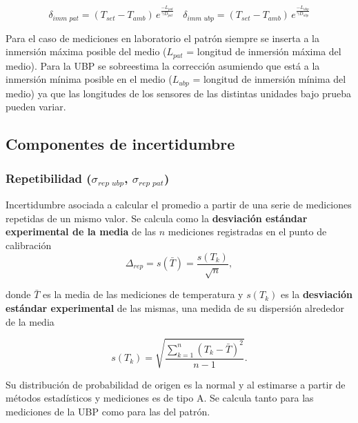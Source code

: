 \begin{equation}
    \delta_{\textit{imm pat}} = (T_{set} - T_{amb})\,e^{\frac{-L_{pat}}{\gamma D_{pat}}} \ \ \ \ \delta_{\textit{imm ubp}} = (T_{set} - T_{amb})\,e^{\frac{-L_{ubp}}{\gamma D_{ubp}}}
\end{equation}

Para el caso de mediciones en laboratorio el patrón siempre se inserta a la inmersión máxima posible del medio ($L_{pat}$ = longitud de inmersión máxima del medio). Para la UBP se sobreestima la corrección asumiendo que está a la inmersión mínima posible en el medio ($L_{ubp}$ = longitud de inmersión mínima del medio) ya que las longitudes de los sensores de las distintas unidades bajo prueba pueden variar.

\subsection{Componentes de incertidumbre}\label{sec:componentes}

\subsubsection{Repetibilidad ($\sigma_{\textit{rep ubp}}$, $\sigma_{\textit{rep pat}}$)}

Incertidumbre asociada a calcular el promedio a partir de una serie de mediciones repetidas de un mismo valor. Se calcula como la \textbf{desviación estándar experimental de la media} de las $n$ mediciones registradas en el punto de calibración \cite{GUM4.2}
\begin{equation}
    \Delta_{\textit{rep}} = s(\bar{T}) = \frac{s(T_k)}{\sqrt{n}},
\end{equation}

donde $\bar{T}$ es la media de las mediciones de temperatura y $s(T_k)$ es la \textbf{desviación estándar experimental} de las mismas, una medida de su dispersión alrededor de la media

\begin{equation}
    s(T_k) = \sqrt{\frac{\sum_{k=1}^{n}(T_k - \bar{T})^2}{n-1}}.
\end{equation}

Su distribución de probabilidad de origen es la normal y al estimarse a partir de métodos estadísticos y mediciones es de tipo A. Se calcula tanto para las mediciones de la UBP como para las del patrón.


